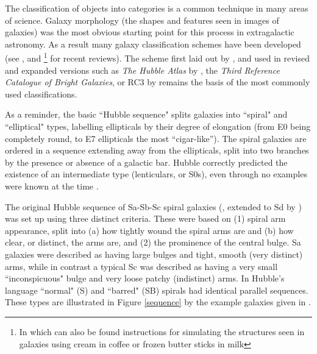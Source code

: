 \documentclass[usenatbib]{mn2e}
\begin{document}
The classification of objects into categories is a common technique in many areas of science. Galaxy morphology (the shapes and features seen in images of galaxies) was the most obvious starting point for this process in extragalactic astronomy. %
As a result many galaxy classification schemes have been developed (see \citealt{Buta2013}, and \citealt{Sandage2005}\footnote{In which can also be found instructions for simulating the structures seen in galaxies using cream in coffee or frozen butter sticks in milk} for recent reviews).
The scheme first laid out by \citet{Hubble1926,Hubble1936}, and used in revised and expanded versions such as {\it The Hubble Atlas} by \citet{Sandage1961}, the {\it Third Reference Catalogue of Bright Galaxies}, or RC3 by \citealt{1991rc3..book.....D} remains the basis of the most commonly used classifications. 

As a reminder, the basic ``Hubble sequence" splits galaxies into ``spiral" and ``elliptical" types, labelling ellipticals by their degree of elongation (from E0 being completely round, to E7 ellipticals the most ``cigar-like''). The spiral galaxies are ordered in a sequence extending away from the ellipticals, split into two branches by the presence or absence of a galactic bar. 
Hubble correctly predicted the existence of an intermediate type (lenticulars, or S0s), even through no examples were known at the time \citep{Buta2013}. 

The original Hubble sequence of Sa-Sb-Sc spiral galaxies (\citealt{Hubble1926}, extended to Sd by \citealt{1959HDP....53..275D}) was set up using three distinct criteria. These were based on (1) spiral arm appearance, split into (a) how tightly wound the spiral arms are and (b) how clear, or distinct, the arms are, and (2) the prominence of the central bulge. Sa galaxies were described as having large bulges and tight, smooth (very distinct) arms, while in contrast a typical Sc was described as having a very small ``inconspicuous" bulge and very loose patchy (indistinct) arms. In Hubble's language ``normal" (S) and ``barred" (SB) spirals had identical parallel sequences. These types are illustrated in Figure \ref{sequence} by the example galaxies given in \citet{Hubble1926}. 
\end{document}
